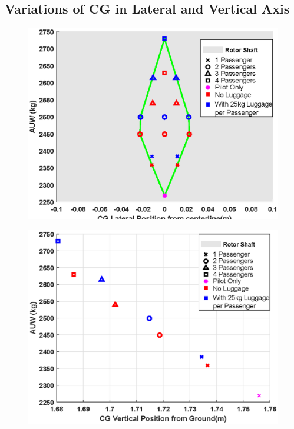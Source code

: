 \documentclass[11pt,a4paper]{article}
\begin{document}
\begin{appendices}
\section{Variations of CG in Lateral and Vertical Axis}
\begin{figure}[H]
\centering
\begin{minipage}{.49\textwidth}
  \centering
  \includegraphics[width=\linewidth]{CGLATVAUW.eps}
  \label{fig:CGlat}
\end{minipage}%
\begin{minipage}{.49\textwidth}
  \centering
  \includegraphics[width=\linewidth]{CGVERTVAUW.eps}
  \label{fig:CGvert}
\end{minipage}
\end{figure}


\end{appendices}
\end{document}
